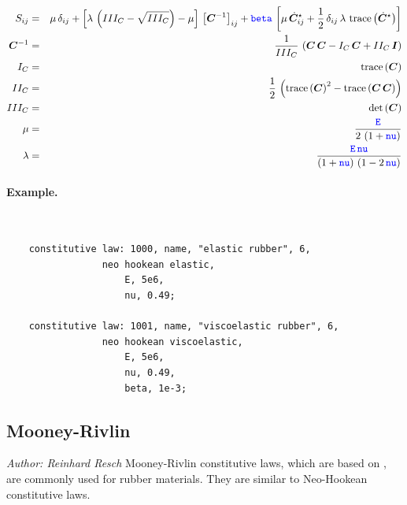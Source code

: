 \begin{eqnarray}
  S_{ij} & = & \mu \, \delta_{ij} + \left[\lambda \, \left(III_C - \sqrt{III_C} \right) - \mu\right] \, \left[ \boldsymbol{C}^{-1} \right]_{ij}
  + \textcolor{blue}{\texttt{beta}} \, \left[\mu \, \dot{\boldsymbol{C}}_{ij}^{\star} + \frac{1}{2} \, \delta_{ij} \, \lambda \, \operatorname{trace}\left(\dot{\boldsymbol{C}}^{\star}\right)\right]\\
  \boldsymbol{C}^{-1} & = & \frac{1}{III_C} \, \left(\boldsymbol{C} \, \boldsymbol{C} - I_C \, \boldsymbol{C} + II_C \, \boldsymbol{I} \right) \\
  I_C & = & \operatorname{trace}\left(\boldsymbol{C}\right) \\
  II_C & = & \frac{1}{2} \,\left(\operatorname{trace}\left(\boldsymbol{C}\right)^2 - \operatorname{trace}\left(\boldsymbol{C} \, \boldsymbol{C}\right)\right) \\
  III_C & = & \det\left(\boldsymbol{C}\right) \\
  \mu & = & \frac{\textcolor{blue}{\texttt{E}}}{2 \, \left(1 + \textcolor{blue}{\texttt{nu}}\right)} \\
  \lambda & = & \frac{\textcolor{blue}{\texttt{E}} \, \textcolor{blue}{\texttt{nu}}}{\left(1 + \textcolor{blue}{\texttt{nu}}\right) \, \left(1 - 2 \, \textcolor{blue}{\texttt{nu}} \right)}
\end{eqnarray}

\paragraph{Example.} \
\begin{verbatim}
    constitutive law: 1000, name, "elastic rubber", 6,
                 neo hookean elastic,
                     E, 5e6,
                     nu, 0.49;

    constitutive law: 1001, name, "viscoelastic rubber", 6,
                 neo hookean viscoelastic,
                     E, 5e6,
                     nu, 0.49,
                     beta, 1e-3;
\end{verbatim}

\subsection{Mooney-Rivlin}
\label{sec:CL:mooney-rivlin}
\emph{Author: Reinhard Resch}
Mooney-Rivlin constitutive laws, which are based on \cite{BATHE2016}, are commonly used for rubber materials.
They are similar to Neo-Hookean constitutive laws.
